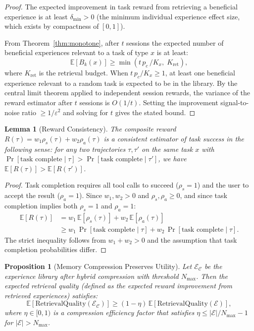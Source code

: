 \documentclass[11pt]{article}
\newtheorem{lemma}[theorem]{Lemma}
\newtheorem{proposition}[theorem]{Proposition}
\begin{document}
\begin{proof}
The expected improvement in task reward from retrieving a beneficial experience
is at least $\delta_{\min} > 0$ (the minimum individual experience effect size,
which exists by compactness of $[0,1]$).

From Theorem~\ref{thm:monotone}, after $t$ sessions the expected number of
beneficial experiences relevant to a task of type $x$ is at least:
\begin{equation}
    \mathbb{E}[B_k(x)] \geq \min\!\left(t\,p_c\,/K_x,\; K_{\text{ret}}\right),
\end{equation}
where $K_{\text{ret}}$ is the retrieval budget. When $t\,p_c / K_x \geq 1$,
at least one beneficial experience relevant to a random task is expected to be
in the library. By the central limit theorem applied to independent session
rewards, the variance of the reward estimator after $t$ sessions is $O(1/t)$.
Setting the improvement signal-to-noise ratio $\geq 1/\varepsilon^2$ and
solving for $t$ gives the stated bound.
\end{proof}

\begin{lemma}[Reward Consistency]
\label{lem:consistency}
The composite reward $R(\tau) = w_1 \rho_s(\tau) + w_2 \rho_a(\tau)$ is a
consistent estimator of task success in the following sense: for any two
trajectories $\tau, \tau'$ on the same task $x$ with
$\Pr[\text{task complete} \mid \tau] > \Pr[\text{task complete} \mid \tau']$,
we have $\mathbb{E}[R(\tau)] > \mathbb{E}[R(\tau')]$.
\end{lemma}

\begin{proof}
Task completion requires all tool calls to succeed ($\rho_s = 1$) and the
user to accept the result ($\rho_a = 1$). Since $w_1, w_2 > 0$ and
$\rho_s, \rho_a \geq 0$, and since task completion implies both $\rho_s = 1$
and $\rho_a = 1$:
\begin{align}
    \mathbb{E}[R(\tau)] &= w_1\,\mathbb{E}[\rho_s(\tau)] + w_2\,\mathbb{E}[\rho_a(\tau)] \\
    &\geq w_1\,\Pr[\text{task complete} \mid \tau] + w_2\,\Pr[\text{task complete} \mid \tau].
\end{align}
The strict inequality follows from $w_1 + w_2 > 0$ and the assumption that
task completion probabilities differ.
\end{proof}

\begin{proposition}[Memory Compression Preserves Utility]
\label{prop:compression}
Let $\mathcal{E}_\mathcal{C}$ be the experience library after hybrid
compression with threshold $N_{\max}$. Then the expected retrieval quality
(defined as the expected reward improvement from retrieved experiences)
satisfies:
\begin{equation}
    \mathbb{E}[\text{RetrievalQuality}(\mathcal{E}_\mathcal{C})]
    \geq (1 - \eta)\,\mathbb{E}[\text{RetrievalQuality}(\mathcal{E})],
    \label{eq:compression-quality}
\end{equation}
where $\eta \in [0, 1)$ is a compression efficiency factor that satisfies
$\eta \leq |\mathcal{E}| / N_{\max} - 1$ for $|\mathcal{E}| > N_{\max}$.
\end{proposition}
\end{document}
